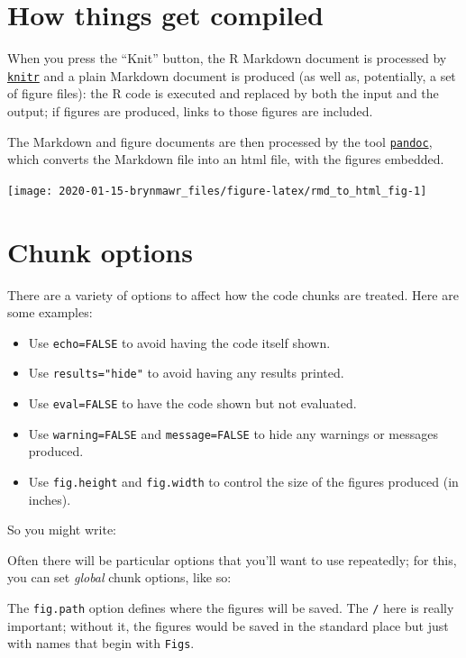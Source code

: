 \documentclass[]{book}
\providecommand{\tightlist}{%
  \setlength{\itemsep}{0pt}\setlength{\parskip}{0pt}}
\begin{document}
\section{How things get compiled}\label{how-things-get-compiled}

When you press the ``Knit'' button, the R Markdown document is processed
by \href{http://yihui.name/knitr}{\texttt{knitr}} and a plain Markdown
document is produced (as well as, potentially, a set of figure files):
the R code is executed and replaced by both the input and the output; if
figures are produced, links to those figures are included.

The Markdown and figure documents are then processed by the tool
\href{http://pandoc.org/}{\texttt{pandoc}}, which converts the Markdown
file into an html file, with the figures embedded.

\begin{flushleft}\texttt{[image: 2020-01-15-brynmawr\_files/figure-latex/rmd\_to\_html\_fig-1]} \end{flushleft}

\section{Chunk options}\label{chunk-options}

There are a variety of options to affect how the code chunks are
treated. Here are some examples:

\begin{itemize}
\tightlist
\item
  Use \texttt{echo=FALSE} to avoid having the code itself shown.
\item
  Use \texttt{results="hide"} to avoid having any results printed.
\item
  Use \texttt{eval=FALSE} to have the code shown but not evaluated.
\item
  Use \texttt{warning=FALSE} and \texttt{message=FALSE} to hide any
  warnings or messages produced.
\item
  Use \texttt{fig.height} and \texttt{fig.width} to control the size of
  the figures produced (in inches).
\end{itemize}

So you might write:

Often there will be particular options that you'll want to use
repeatedly; for this, you can set \emph{global} chunk options, like so:

The \texttt{fig.path} option defines where the figures will be saved.
The \texttt{/} here is really important; without it, the figures would
be saved in the standard place but just with names that begin with
\texttt{Figs}.
\end{document}
